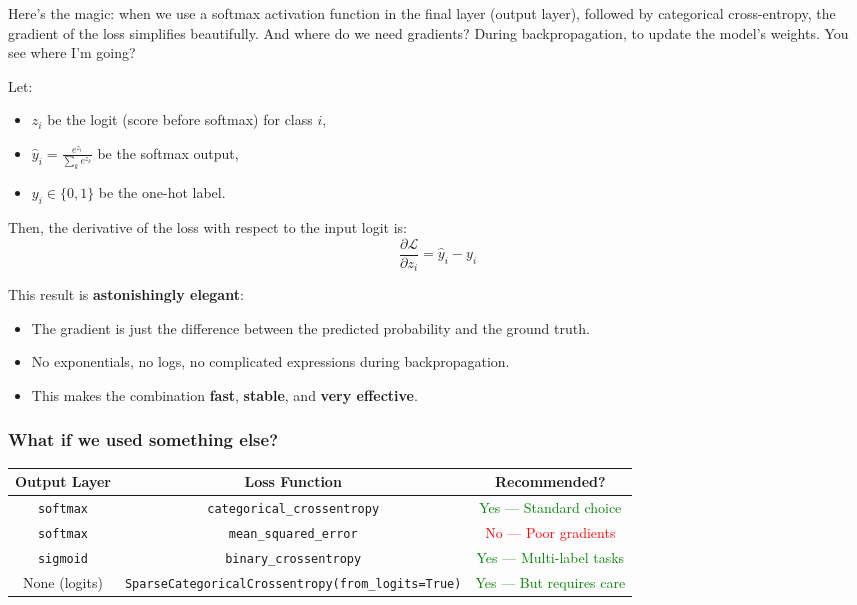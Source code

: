 \documentclass[11pt]{article}
\begin{document}
Here’s the magic: when we use a softmax activation function in the final layer (output layer), followed by categorical cross-entropy, the gradient of the loss simplifies beautifully. And where do we need gradients? During backpropagation, to update the model’s weights. You see where I’m going?

\medskip

Let:
\begin{itemize}
    \item $z_i$ be the logit (score before softmax) for class $i$,
    \item $\hat{y}_i = \frac{e^{z_i}}{\sum_k e^{z_k}}$ be the softmax output,
    \item $y_i \in \{0,1\}$ be the one-hot label.
\end{itemize}

Then, the derivative of the loss with respect to the input logit is:
\[
\boxed{
\frac{\partial \mathcal{L}}{\partial z_i} = \hat{y}_i - y_i
}
\]

This result is \textbf{astonishingly elegant}:
\begin{itemize}
    \item The gradient is just the difference between the predicted probability and the ground truth.
    \item No exponentials, no logs, no complicated expressions during backpropagation.
    \item This makes the combination \textbf{fast}, \textbf{stable}, and \textbf{very effective}.
\end{itemize}

\subsubsection*{What if we used something else?}

\begin{center}
\begin{tabular}{|c|c|c|}
\hline
Output Layer & Loss Function & Recommended? \\
\hline
\texttt{softmax} & \texttt{categorical\_crossentropy} & \textcolor{green}{Yes — Standard choice} \\
\texttt{softmax} & \texttt{mean\_squared\_error}       & \textcolor{red}{No — Poor gradients} \\
\texttt{sigmoid} & \texttt{binary\_crossentropy}       & \textcolor{green}{Yes — Multi-label tasks} \\
None (logits)    & \texttt{SparseCategoricalCrossentropy(from\_logits=True)} & \textcolor{green}{Yes — But requires care} \\
\hline
\end{tabular}
\end{center}
\end{document}
